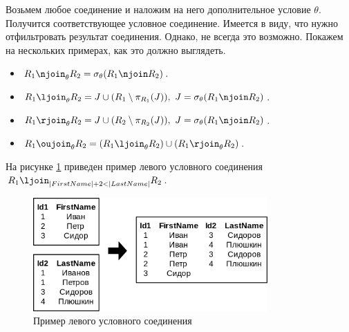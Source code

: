 \begin{definition}
	Возьмем любое соединение и наложим на него дополнительное условие $\theta$. Получится
	соответствующее условное соединение. Имеется в виду, что нужно отфильтровать результат соединения.
	Однако, не всегда это возможно. Покажем на нескольких примерах, как это должно выглядеть.
	\begin{itemize}
		\item $R_1 \njoin_\theta R_2 = \sigma_\theta(R_1 \njoin R_2)$.
		\item $R_1 \ljoin_\theta R_2 = J \cup (R_1 \setminus \pi_{R_1}(J)),~ J = \sigma_\theta(R_1 \njoin R_2)$.
		\item $R_1 \rjoin_\theta R_2 = J \cup (R_2 \setminus \pi_{R_2}(J)),~ J = \sigma_\theta(R_1 \njoin R_2)$.
		\item $R_1 \oujoin_\theta R_2 = (R_1 \ljoin_\theta R_2) \cup (R_1 \rjoin_\theta R_2)$.
	\end{itemize}
\end{definition}

На рисунке \ref{theta-join-ex} приведен пример левого условного соединения
$R_1 \ljoin_{|FirstName| + 2 < |LastName|} R_2$.

\begin{figure}[H]
	\centering
	\includegraphics[width=0.8\textwidth]{../assets/kgeorgiy/relalgebra/Join_LeftTheta_2.svg.png}
	\caption{Пример левого условного соединения}
	\label{theta-join-ex}
\end{figure}

